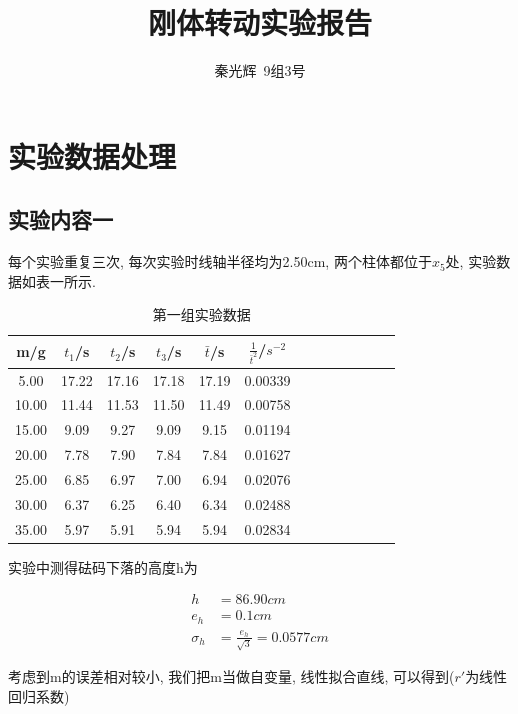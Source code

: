 \documentclass[a4paper,12pt,notitlepage]{article}
\begin{document}
\title{刚体转动实验报告}
\author{秦光辉\ 9组3号}
\maketitle

\section{实验数据处理}

\subsection{实验内容一}

	每个实验重复三次, 每次实验时线轴半径均为2.50cm, 两个柱体都位于$x_5$处, 实验数据如表一所示.
	
\begin{center}
	\begin{longtable}{|c|c|c|c|c|c|c|c|c|c|c|c|c|}

	\caption{第一组实验数据}	\\
	\hline
	m/g & $t_1$/s & $t_2$/s & $t_3$/s & $\bar{t}$/s & $\frac{1}{\bar{t}^2}$/$s^{-2}$ \\
	\hline
	5.00 & 17.22 & 17.16 & 17.18 & 17.19 & 0.00339 \\
	\hline
	10.00 & 11.44 & 11.53 & 11.50 & 11.49 & 0.00758 \\
	\hline
	15.00 & 9.09 & 9.27 & 9.09 & 9.15 & 0.01194 \\
	\hline
	20.00 & 7.78 & 7.90 & 7.84 & 7.84 & 0.01627 \\
	\hline
	25.00 & 6.85 & 6.97 & 7.00 & 6.94 & 0.02076 \\
	\hline
	30.00 & 6.37 & 6.25 & 6.40 & 6.34 & 0.02488 \\
	\hline
	35.00 & 5.97 & 5.91 & 5.94 & 5.94 & 0.02834 \\
	\hline

	\end{longtable}
\end{center}

	实验中测得砝码下落的高度h为
	
\begin{align*}
	h &= 86.90cm \\
	e_h &= 0.1cm \\
	\sigma_h &= \frac{e_h}{\sqrt{3}} = 0.0577cm
\end{align*}

	考虑到m的误差相对较小, 我们把m当做自变量, 线性拟合直线, 可以得到($r'$为线性回归系数)
	
\end{document}
